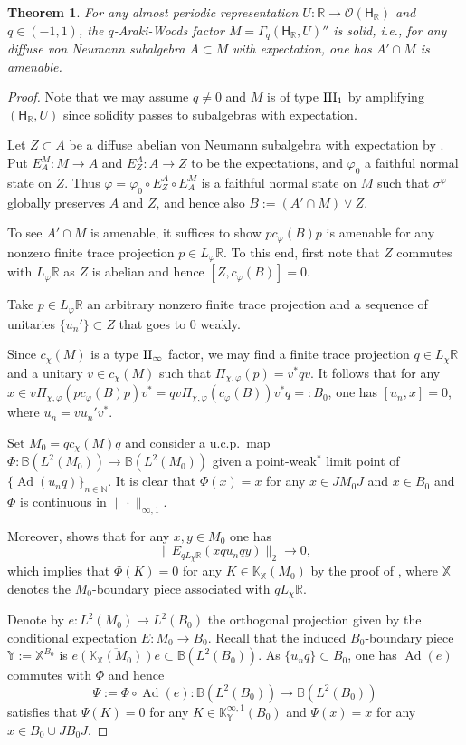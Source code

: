 \documentclass[a4paper,11pt]{amsart}
\newtheorem{thm}{Theorem}[section]
\theoremstyle{definition}
\newcommand{\B}{{\mathbb B}}
\newcommand{\K}{{\mathbb K}}
\newcommand{\N}{{\mathbb N}}
\newcommand{\R}{{\mathbb R}}
\newcommand{\X}{{\mathbb X}}
\newcommand{\Y}{{\mathbb Y}}
\newcommand{\cO}{{\mathcal O}}
\newcommand{\sH}{\mathsf{H}}
\newcommand{\Ad}{\operatorname{Ad}}
\begin{document}
\begin{thm}\label{thm: solid}
For any almost periodic representation  $U: \R\to \cO(\sH_\R)$ and $q\in (-1,1)$,	
	the $q$-Araki-Woods factor $M=\Gamma_q(\sH_\R, U)''$ is solid, i.e., 
	for any diffuse von Neumann subalgebra $A\subset M$ with expectation,
	one has $A'\cap M$ is amenable.
\end{thm}
\begin{proof}
Note that we may assume $q\neq 0$ and $M$ is of type ${\rm III}_1$ by amplifying $(\sH_\R, U)$ since solidity passes to subalgebras with expectation.

Let $Z\subset A$ be a diffuse abelian von Neumann subalgebra with expectation by \cite[Theorem 11.1]{HaSt90}.
Put $E_A^M: M\to A$ and $E_Z^A: A\to Z$ to be the expectations, and $\varphi_0$ a faithful normal state on $Z$.
Thus $\varphi=\varphi_0\circ E_Z^A\circ E_A^M$ is a faithful normal state on $M$
	such that $\sigma^\varphi$ globally preserves $A$ and $Z$, and hence also $B:=(A'\cap M)\vee Z$.

To see $A'\cap M$ is amenable, it suffices to show $pc_\varphi(B)p$ is amenable for any nonzero finite trace projection $p\in L_\varphi\R$.
To this end, first note that $Z$ commutes with $L_\varphi\R$ as $Z$ is abelian and hence $[Z, c_\varphi(B)]=0$.

Take $p\in L_\varphi\R$ an arbitrary nonzero finite trace projection and a sequence of unitaries $\{u_n'\}\subset Z$ that goes to $0$ weakly.

Since $c_\chi(M)$ is a type ${\rm II}_\infty$ factor, we may find a finite trace projection $q\in L_\chi\R$ and 
	a unitary $v\in c_\chi(M)$ such that 
	$\Pi_{\chi,\varphi}(p) =v^*qv$.	
It follows that for any $x\in v \Pi_{\chi,\varphi}(p c_\varphi(B) p) v^*=q v \Pi_{\chi,\varphi}(c_\varphi(B))v^* q=:B_0$,
	one has $[u_n, x]= 0$, where $u_n=v u_n' v^*$.

Set $M_0=q c_\chi(M) q$ and 	
	consider a u.c.p.\ map $\Phi: \B(L^2(M_0))\to \B(L^2(M_0))$ given a point-weak$^*$ limit point of $\{\Ad(u_nq)\}_{n\in \N}$.
It is clear that $\Phi(x)=x$ for any $x\in JM_0J$ and $x\in B_0$
	and $\Phi$ is continuous in $\|\cdot\|_{\infty,1}$.

Moreover, \cite[Proposition 5.3]{HoRa15} shows that for any $x,y\in M_0$ one has
$$
\|E_{qL_\chi\R}(xqu_n qy)\|_2\to 0,
$$
which implies that $\Phi(K)=0$ for any $K\in \K_\X (M_0)$ by the proof of \cite[Lemma 6.12]{DP23},
	where $\X$ denotes the $M_0$-boundary piece associated with $qL_\chi\R$.

Denote by $e: L^2(M_0)\to L^2(B_0)$ the orthogonal projection given by the conditional expectation $E: M_0\to B_0$.
Recall that the induced $B_0$-boundary piece $\Y:=\X^{B_0}$	is  
	$\overline{e(\K_\X(M_0))e}\subset \B(L^2(B_0))$.
As $\{u_nq\}\subset B_0$, one has $\Ad(e)$ commutes with $\Phi$ and hence
$$
\Psi:=\Phi\circ \Ad(e): \B(L^2(B_0))\to \B(L^2(B_0))
$$
satisfies that $\Psi(K)=0$ for any $K\in \K_\Y^{\infty,1}(B_0)$ and $\Psi(x)=x$ for any $x\in B_0\cup JB_0J$.


\end{proof}
\end{document}
